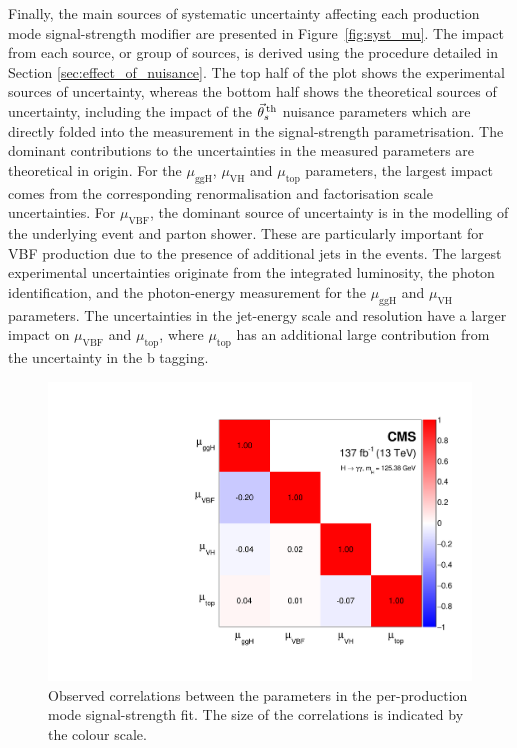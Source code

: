 Finally, the main sources of systematic uncertainty affecting each production mode signal-strength modifier are presented in Figure~\ref{fig:syst_mu}. The impact from each source, or group of sources, is derived using the procedure detailed in Section \ref{sec:effect_of_nuisance}. The top half of the plot shows the experimental sources of uncertainty, whereas the bottom half shows the theoretical sources of uncertainty, including the impact of the $\vec{\theta}^{\,\rm{th}}_{s}$ nuisance parameters which are directly folded into the measurement in the signal-strength parametrisation. The dominant contributions to the uncertainties in the measured parameters are theoretical in origin. For the $\mu_{\text{ggH}}$, $\mu_{\text{VH}}$ and $\mu_{\text{top}}$ parameters, the largest impact comes from the corresponding renormalisation and factorisation scale uncertainties. For $\mu_{\text{VBF}}$, the dominant source of uncertainty is in the modelling of the underlying event and parton shower. These are particularly important for VBF production due to the presence of additional jets in the events. The largest experimental uncertainties originate from the integrated luminosity, the photon identification, and the photon-energy measurement for the $\mu_{\text{ggH}}$ and $\mu_{\text{VH}}$ parameters. The uncertainties in the jet-energy scale and resolution have a larger impact on $\mu_{\text{VBF}}$ and $\mu_{\text{top}}$, where $\mu_{\text{top}}$ has an additional large contribution from the uncertainty in the b tagging.

\begin{figure}
  \centering
  \includegraphics[width=.6\textwidth]{Figures/hgg_results/mu_correlations.pdf}
  \caption[Correlations between per-production mode signal-strengths]
  {
    Observed correlations between the parameters in the per-production mode signal-strength fit. The size of the correlations is indicated by the colour scale.
  }
  \label{fig:corr_mu}
\end{figure}

